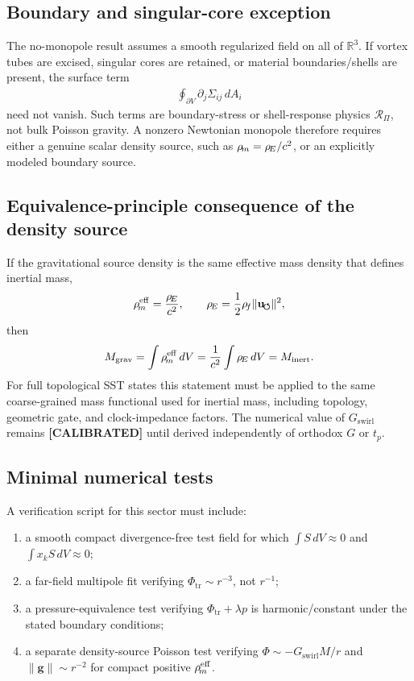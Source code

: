 \subsection{Boundary and singular-core exception}
The no-monopole result assumes a smooth regularized field on all of
\(\mathbb{R}^3\).  If vortex tubes are excised, singular cores are retained,
or material boundaries/shells are present, the surface term
\begin{align}
    \oint_{\partial V}\partial_j\Sigma_{ij}\,dA_i
\end{align}
need not vanish.  Such terms are boundary-stress or shell-response physics
\(\mathcal{R}_{\Pi}\), not bulk Poisson gravity.  A nonzero Newtonian monopole
therefore requires either a genuine scalar density source, such as
\(\rho_{\!m}=\rho_{\!E}/c^2\), or an explicitly modeled boundary source.

\subsection{Equivalence-principle consequence of the density source}
If the gravitational source density is the same effective mass density that
defines inertial mass,
\begin{align}
    \rho_{\!m}^{\mathrm{eff}}
    =
    \frac{\rho_{\!E}}{c^2},
    \qquad
    \rho_{\!E}=\frac{1}{2}\rho_{\!f}\lVert\mathbf{u}_{\!\boldsymbol{\circlearrowleft}}\rVert^2,
\end{align}
then
\begin{align}
    M_{\mathrm{grav}}
    =
    \int\rho_{\!m}^{\mathrm{eff}}\,dV
    =
    \frac{1}{c^2}\int\rho_{\!E}\,dV
    =
    M_{\mathrm{inert}} .
\end{align}
For full topological SST states this statement must be applied to the same
coarse-grained mass functional used for inertial mass, including topology,
geometric gate, and clock-impedance factors.  The numerical value of
\(G_{\mathrm{swirl}}\) remains \textbf{[CALIBRATED]} until derived
independently of orthodox \(G\) or \(t_p\).

\subsection{Minimal numerical tests}
A verification script for this sector must include:
\begin{enumerate}
    \item a smooth compact divergence-free test field for which
    \(\int S\,dV\approx0\) and \(\int x_kS\,dV\approx0\);
    \item a far-field multipole fit verifying
    \(\Phi_{\mathrm{tr}}\sim r^{-3}\), not \(r^{-1}\);
    \item a pressure-equivalence test verifying
    \(\Phi_{\mathrm{tr}}+\lambda p\) is harmonic/constant under the stated
    boundary conditions;
    \item a separate density-source Poisson test verifying
    \(\Phi\sim -G_{\mathrm{swirl}}M/r\) and
    \(\lVert\mathbf{g}\rVert\sim r^{-2}\) for compact positive
    \(\rho_{\!m}^{\mathrm{eff}}\).
\end{enumerate}

